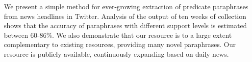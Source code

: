 We present a simple method for ever-growing extraction of predicate paraphrases from news headlines in Twitter. Analysis of the output of ten weeks of collection shows that the accuracy of paraphrases with different support levels is estimated between 60-86\%. We also demonstrate that our resource is to a large extent complementary to existing resources, providing many novel paraphrases. Our resource is publicly available, continuously expanding based on daily news.
